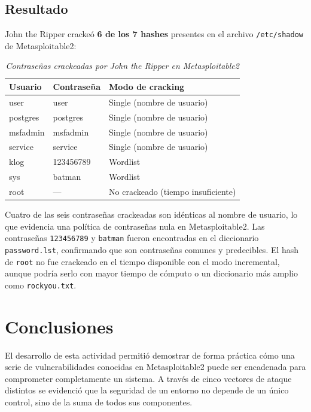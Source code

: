 \documentclass[12pt, letterpaper]{article}
\begin{document}
\subsection{Resultado}

John the Ripper crackeó \textbf{6 de los 7 hashes} presentes en el archivo \texttt{/etc/shadow} de Metasploitable2:

\begin{table}[H]
  \centering
  \caption{\textit{Contraseñas crackeadas por John the Ripper en Metasploitable2}}
  \begin{tabular}{@{}lll@{}}
    \toprule
    \textbf{Usuario} & \textbf{Contraseña} & \textbf{Modo de cracking} \\
    \midrule
    user     & user      & Single (nombre de usuario) \\
    postgres & postgres  & Single (nombre de usuario) \\
    msfadmin & msfadmin  & Single (nombre de usuario) \\
    service  & service   & Single (nombre de usuario) \\
    klog     & 123456789 & Wordlist \\
    sys      & batman    & Wordlist \\
    root     & —         & No crackeado (tiempo insuficiente) \\
    \bottomrule
  \end{tabular}
\end{table}

Cuatro de las seis contraseñas crackeadas son idénticas al nombre de usuario, lo que evidencia una política de contraseñas nula en Metasploitable2. Las contraseñas \texttt{123456789} y \texttt{batman} fueron encontradas en el diccionario \texttt{password.lst}, confirmando que son contraseñas comunes y predecibles. El hash de \texttt{root} no fue crackeado en el tiempo disponible con el modo incremental, aunque podría serlo con mayor tiempo de cómputo o un diccionario más amplio como \texttt{rockyou.txt}.

\section{Conclusiones}

El desarrollo de esta actividad permitió demostrar de forma práctica cómo una serie de vulnerabilidades conocidas en Metasploitable2 puede ser encadenada para comprometer completamente un sistema. A través de cinco vectores de ataque distintos se evidenció que la seguridad de un entorno no depende de un único control, sino de la suma de todos sus componentes.
\end{document}
